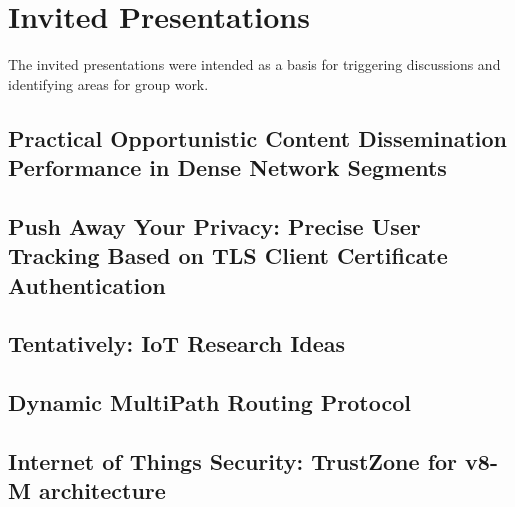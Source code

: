 \section{Invited Presentations}\label{sec:invited-presentations}

The invited presentations were intended as a basis for triggering discussions
and identifying areas for group work.

\subsection{Practical Opportunistic Content Dissemination Performance in Dense
Network Segments}

\subsection{Push Away Your Privacy: Precise User Tracking Based on TLS Client Certificate
 Authentication} %

\subsection{Tentatively: IoT Research Ideas}

\subsection{Dynamic MultiPath Routing Protocol}

\subsection{Internet of Things Security: TrustZone for v8-M architecture}


